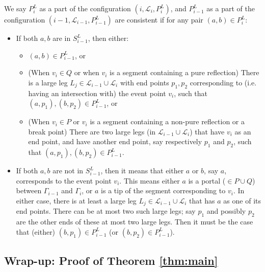 \documentclass[pdflatex,sn-mathphys-num]{sn-jnl}
\theoremstyle{thmstyleone}
\begin{document}
	We say $ P^L_i $ as a part of the configuration $ (i, \mathcal L_i, P^L_i) $, and $ P^L_{i - 1} $ as a part of the configuration $ (i-1, \mathcal L_{i - 1}, P^L_{i - 1}) $ are consistent if for any pair $ (a, b)\in P^L_i $:
	\begin{itemize}
		\item If both $ a, b $ are in $ S_{i - 1}^L $, then either:
			\begin{itemize}
				\item $ (a, b) \in P^L_{i-1} $, or
				\item (When $ v_i \in Q $ or when $ v_i $ is a segment containing a pure reflection) There is a large leg $ L_j\in \mathcal L_{i - 1} \cup \mathcal L_{i} $ with end points $ p_1, p_2 $ corresponding to (i.e. having an intersection with) the event point $ v_i $,
					such that $ (a, p_1), (b, p_2)\in P^L_{i - 1} $, or
				\item (When $ v_i\in P $ or $ v_i $ is a segment containing a non-pure reflection or a break point)
				There are two large legs (in $ \mathcal L_{i - 1} \cup \mathcal L_{i} $) that have $ v_i $ as an end point, and have another end point, say respectively $ p_1 $ and $ p_2 $, such that  $ (a, p_1), (b, p_2)\in P^L_{i-1} $.
				
			\end{itemize}
		
		
		\item If both $ a, b $ are not in $ S_{i - 1}^L $, then it means that either $ a $ or $ b $, say $ a $, corresponds to the event point $ v_i $. This means either $ a $ is a portal ($ \in P\cup Q $) between $ \Gamma_{i-1} $ and $ \Gamma_i $, or $ a $ is a tip of the segment corresponding to $ v_i $. In either case, there is at least a large leg $ L_j \in \mathcal L_{i - 1} \cup \mathcal L_{i} $ that has $ a $ as one of its end points. There can be at most two such large legs; say $ p_1 $ and possibly $ p_2 $ are the other ends of these at most two large legs.
		Then 
		it must be the case that
		(either) $ (b, p_1) \in P^L_{i - 1} $ (or $ (b, p_2) \in P^L_{i - 1} $).
	\end{itemize}


\subsection{Wrap-up: Proof of Theorem \ref{thm:main}}\label{sec:main-theo-proof}
\end{document}
